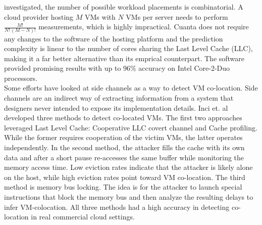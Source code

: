 investigated, the number of possible workload placements is combinatorial. A cloud provider hosting 
$M$ VMs with $N$ VMs per server needs to perform $\frac{M!}{N!\,(M-N)!}$ measurements, which is
highly impractical. Cuanta does not require any changes to the software of the hosting platform and the 
prediction complexity is linear to the number of cores sharing the Last Level Cache (LLC), 
making it a far better alternative than its emprical counterpart. 
The software provided promising results with up to 96\% accuracy on Intel Core-2-Duo processors. \\
Some efforts have looked at side channels as a way to detect VM co-location. Side channels are an indirect
way of extracting information from a system that designers never intended to expose its implementation
details. Inci et. al \cite{LLC} developed three methods to detect co-located VMs. 
The first two approaches leveraged Last Level Cache: Cooperative LLC covert channel and  
Cache profiling. While the former requires cooperation of the victim VMs, the latter operates
independently. In the second method, the attacker fills the cache with its own data and after a
short pause re-accesses the same buffer while monitoring the memory access time. Low eviction rates
indicate that the attacker is likely alone on the host, while high eviction rates point toward 
VM co-location. The third method is memory bus locking. The idea is for the attacker to launch 
special instructions that block the memory bus and then analyze the resulting delays to infer 
VM-colocation. All three methods had a high accuracy in detecting co-location in real commercial cloud
settings.

\begin{comment}
They also investigated performance variation that's caused by hardware heterogeneity
in the same instance type. They examined this trend on 12 VM types across 1st (m1, c1), 2nd (m2), 
and 3rd (c3) EC2 generationand found that 25\% of the types had more than one hardware implementation. They implemented the virtual 
machine scaler, a web services application, that helps with VM management/placement on AWS. 
It features the "forceCpuType" parameter, that allows the user to specify the backing CPU, enforcing hardware 
homogeneity. Mon-matching VMs are repeatedly terminated until the "right" CPU is allocated. 
With this, they were able to improve scientific modeling web services performance by up to 14\%.
\end{comment}